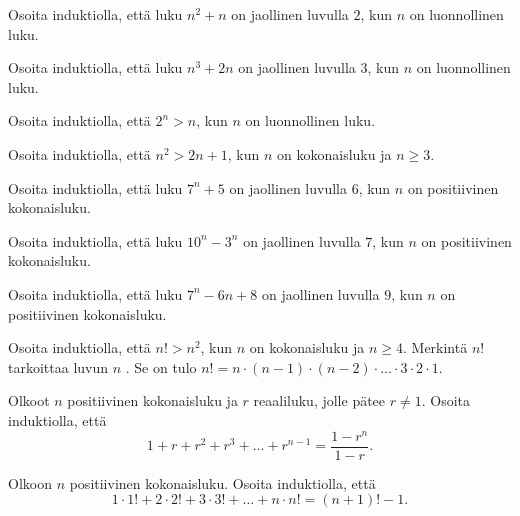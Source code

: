 \setcounter{tehtava}{0}

\begin{tehtavasivu}

\begin{tehtava}
	Osoita induktiolla, että luku $n^2+n$ on jaollinen luvulla $2$, kun $n$ on luonnollinen luku.
\end{tehtava}

\begin{tehtava}
	Osoita induktiolla, että luku $n^3+2n$ on jaollinen luvulla $3$, kun $n$ on luonnollinen luku.
\end{tehtava}

\begin{tehtava}
	Osoita induktiolla, että $2^n > n$, kun $n$ on luonnollinen luku.
\end{tehtava}

\begin{tehtava}
	Osoita induktiolla, että $n^2 > 2n + 1$, kun $n$ on kokonaisluku ja $n \ge 3$.
\end{tehtava}

\begin{tehtava}
	Osoita induktiolla, että luku $7^n + 5$ on jaollinen luvulla $6$, kun $n$ on positiivinen kokonaisluku.
\end{tehtava}

\begin{tehtava}
	Osoita induktiolla, että luku $10^n - 3^n$ on jaollinen luvulla $7$, kun $n$ on positiivinen kokonaisluku.
\end{tehtava}

\begin{tehtava}
	Osoita induktiolla, että luku $7^n - 6n + 8$ on jaollinen luvulla $9$, kun $n$ on positiivinen kokonaisluku.
\end{tehtava}

\begin{tehtava}
	Osoita induktiolla, että $n! > n^2$, kun $n$ on kokonaisluku ja $n \ge 4$. Merkintä $n!$ tarkoittaa luvun $n$ . Se on tulo $n! = n \cdot (n-1) \cdot (n-2) \cdot \ldots \cdot 3 \cdot 2 \cdot 1$.
\end{tehtava}

\begin{tehtava}
	Olkoot $n$ positiivinen kokonaisluku ja $r$ reaaliluku, jolle pätee $r \neq 1$. Osoita induktiolla, että 
	\[
	1 + r + r^2 + r^3 + \ldots + r^{n-1} = \frac{1-r^n}{1-r}.
	\]
\end{tehtava}

\begin{tehtava}
	Olkoon $n$ positiivinen kokonaisluku. Osoita induktiolla, että 
	\[
	1 \cdot 1! + 2 \cdot 2! + 3 \cdot 3! + \ldots + n \cdot n! = (n + 1)! - 1.
	\]
\end{tehtava}


\end{tehtavasivu}
